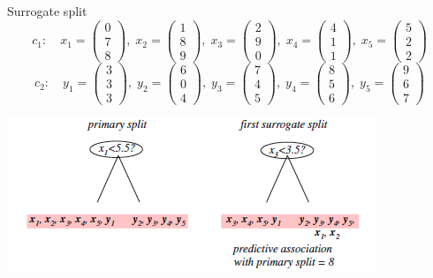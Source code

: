 \documentclass[aspectratio=169]{beamer}
\begin{document}
\begin{frame}{Surrogate split}
\vspace{-1em}
\[
c_1: \quad
x_1=\begin{pmatrix}0 \\ 7 \\ 8\end{pmatrix},\;
x_2=\begin{pmatrix}1 \\ 8 \\ 9\end{pmatrix},\;
x_3=\begin{pmatrix}2 \\ 9 \\ 0\end{pmatrix},\;
x_4=\begin{pmatrix}4 \\ 1 \\ 1\end{pmatrix},\;
x_5=\begin{pmatrix}5 \\ 2 \\ 2\end{pmatrix}
\]
\[
c_2: \quad
y_1=\begin{pmatrix}3 \\ 3 \\ 3\end{pmatrix},\;
y_2=\begin{pmatrix}6 \\ 0 \\ 4\end{pmatrix},\;
y_3=\begin{pmatrix}7 \\ 4 \\ 5\end{pmatrix},\;
y_4=\begin{pmatrix}8 \\ 5 \\ 6\end{pmatrix},\;
y_5=\begin{pmatrix}9 \\ 6 \\ 7\end{pmatrix}
\]
\begin{center}
\includegraphics[scale=0.5]{images/surrogate2.png}
\end{center}

\end{frame}
\end{document}
